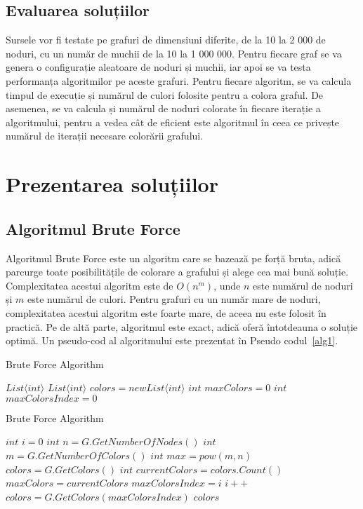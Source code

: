 \documentclass[runningheads]{llncs}
\begin{document}
\subsection{Evaluarea soluțiilor}
Sursele vor fi testate pe grafuri de dimensiuni diferite, de la 10 la 2 000 de noduri,
cu un număr de muchii de la 10 la 1 000 000. Pentru fiecare graf se va genera o
configurație aleatoare de noduri și muchii, iar apoi se va testa performanța
algoritmilor pe aceste grafuri. Pentru fiecare algoritm, se va calcula timpul de
execuție și numărul de culori folosite pentru a colora graful. De asemenea, se va
calcula și numărul de noduri colorate în fiecare iterație a algoritmului, pentru a
vedea cât de eficient este algoritmul în ceea ce privește numărul de iterații
necesare colorării grafului.

\section{Prezentarea soluțiilor}
\subsection{Algoritmul Brute Force}
Algoritmul Brute Force este un algoritm care se bazează pe forță bruta, adică
parcurge toate posibilitățile de colorare a grafului și alege cea mai bună
soluție. Complexitatea acestui algoritm este de $O(n^m)$, unde $n$ este numărul de noduri și $m$ este
numărul de culori. Pentru grafuri cu un număr mare de noduri, complexitatea
acestui algoritm este foarte mare, de aceea nu este folosit în practică. Pe de altă parte,
algoritmul este exact, adică oferă întotdeauna o soluție optimă. Un pseudo-cod al
algoritmului este prezentat în Pseudo codul~\ref{alg1}.

\begin{algorithm}
\caption{Brute Force Algorithm}
\label{alg1}
\begin{algorithmic}[1]
 \Return $List\langle int\rangle $ 
\State $List\langle int\rangle $ $colors = new List\langle int\rangle $ 
\State $int$ $maxColors = 0$ 
\State $int$ $maxColorsIndex = 0$ 
\end{algorithmic}
\end{algorithm}

\addtocounter{algorithm}{-1}
\begin{algorithm}
\caption{Brute Force Algorithm}
\begin{algorithmic}[1]
\State $int$ $i = 0$ 
\State $int$ $n = G.GetNumberOfNodes()$ 
\State $int$ $m = G.GetNumberOfColors()$ 
\State $int$ $max = pow(m, n)$ 
\State $colors = G.GetColors()$
\State $int$ $currentColors = colors.Count()$
\State $maxColors = currentColors$
\State $maxColorsIndex = i$
\EndIf
\State $i++$
\EndWhile
\State $colors = G.GetColors(maxColorsIndex)$
\State \Return $colors$
\EndProcedure
\end{algorithmic}
\end{algorithm}
\end{document}
